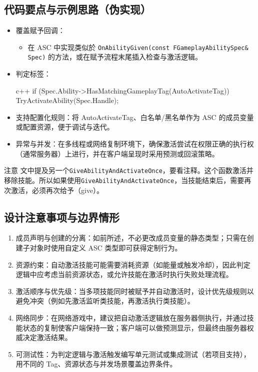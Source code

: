 \documentclass[10pt,CJKmath]{zhbook-v1}
\newcommand{\il}[1]{\texttt{#1}}%
\begin{document}
\subsection{代码要点与示例思路（伪实现）}
\begin{itemize}
\item 覆盖赋予回调：
\begin{itemize}
\item 在 ASC 中实现类似於 \il{OnAbilityGiven(const FGameplayAbilitySpec& Spec)} 的方法，或在赋予流程末尾插入检查与激活逻辑。
\end{itemize}
\item 判定标签：
\begin{amzcode}{c++}
if (Spec.Ability->HasMatchingGameplayTag(AutoActivateTag))
{
	TryActivateAbility(Spec.Handle);
}
\end{amzcode}
\item 支持配置化规则：将 AutoActivateTag、白名单/黑名单作为 ASC 的成员变量或配置资源，便于调试与迭代。
\item 异常与并发：在多线程或网络复制环境下，确保激活尝试在权限正确的执行权（通常服务器）上进行，并在客户端呈现时采用预测或回滚策略。
\end{itemize}
\begin{genbox}{注意}
文中提及另一个\il{GiveAbilityAndActivateOnce}，要看注释。这个函数激活并移除技能。所以如果使用\il{GiveAbilityAndActivateOnce}，当技能结束后，需要再次激活，必须再次给予（give）。
\end{genbox}
\subsection{设计注意事项与边界情形}
\begin{enumerate}
\item 成员声明与创建的分离：如前所述，不必更改成员变量的静态类型；只需在创建子对象时使用自定义 ASC 类型即可获得定制行为。
\item 资源约束：自动激活技能可能需要消耗资源（如能量或触发冷却），因此判定逻辑中应考虑当前资源状态，或允许技能在激活时执行失败处理流程。
\item 激活顺序与优先级：当多项技能同时被赋予并自动激活时，设计优先级规则以避免冲突（例如先激活监听类技能，再激活执行类技能）。
\item 网络同步：在网络游戏中，建议把自动激活逻辑放在服务器侧执行，并通过技能状态的复制使客户端保持一致；客户端可以做预测显示，但最终由服务器权威决定激活结果。
\item 可测试性：为判定逻辑与激活触发编写单元测试或集成测试（若项目支持），用不同的 Tag、资源状态与并发场景覆盖边界条件。
\end{enumerate}
\end{document}
